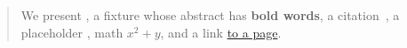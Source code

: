 \begin{abstract}
We present \examplesys{}, a fixture whose abstract has \textbf{bold words}, a
citation~\cite{Key2026}, a placeholder , math $x^2 + y$, and a
link \href{https://example.org}{to a page}. %
\end{abstract}
